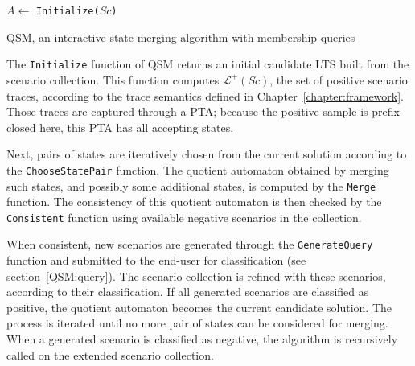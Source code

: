 \vspace{0.3cm}
\begin{algorithm}
{
\vspace{0.2cm}

$A \leftarrow $ {\tt Initialize($Sc$)}\\
}
\vspace{0.2cm}
\caption{\textsc{QSM}, an interactive state-merging algorithm with membership queries\label{QSM}}
\end{algorithm}
\vspace{0.3cm}

The \texttt{Initialize} function of \textsc{QSM} returns an initial candidate LTS built from the scenario collection. This function computes $\mathcal{L}^+(Sc)$, the set of positive scenario traces, according to the trace semantics defined in Chapter~\ref{chapter:framework}. Those traces are captured through a PTA; because the positive sample is prefix-closed here, this PTA has all accepting states.

Next, pairs of states are iteratively chosen from the current solution according to the \texttt{ChooseStatePair} function. The quotient automaton obtained by merging such states, and possibly some additional states, is computed by the \texttt{Merge} function. The consistency of this quotient automaton is then checked by the \texttt{Consistent} function using available negative scenarios in the collection. 

When consistent, new scenarios are generated through the \texttt{GenerateQuery} function and submitted to the end-user for classification (see section~\ref{QSM:query}). The scenario collection is refined with these scenarios, according to their classification. If all generated scenarios are classified as positive, the quotient automaton becomes the current candidate solution. The process is iterated until no more pair of states can be considered for merging. When a generated scenario is classified as negative, the algorithm is recursively called on the extended scenario collection.

